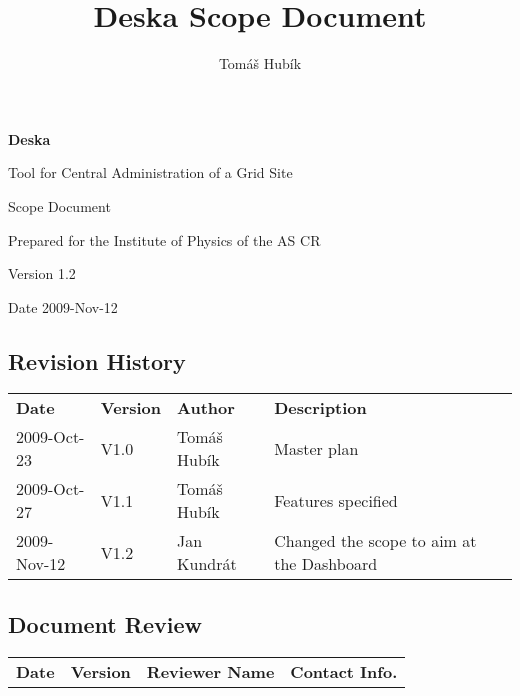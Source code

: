 \documentclass[12pt]{article}
\author{Tomáš Hubík}
\title{Deska Scope Document}
\begin{document}
{\Huge \textbf{Deska}}

\vspace{0.2in}

{\large Tool for Central Administration of a Grid Site}

\vspace{0.5in}

{\large Scope Document}

\vspace{0.2in}

{\large Prepared for the Institute of Physics of the AS CR}

\vspace{0.2in}

{\large Version 1.2}

\vspace{0.2in}

{\large Date 2009-Nov-12}

\vspace{0.5in}

\subsection*{Revision History}

\begin{table}[!h]
	\begin{tabular}{l l l l}
		\textbf{Date} & \textbf{Version} & \textbf{Author} & \textbf{Description} \\
		2009-Oct-23 & V1.0 & Tomáš Hubík & Master plan \\
		2009-Oct-27 & V1.1 & Tomáš Hubík & Features specified \\
		2009-Nov-12 & V1.2 & Jan Kundrát & Changed the scope to aim at the
        Dashboard \\
	\end{tabular}
	\label{tab:RevisionHistory}
\end{table}


\subsection*{Document Review}

\begin{table}[!h]
	\begin{tabular}{l l l l}
		\textbf{Date} & \textbf{Version} & \textbf{Reviewer Name} & \textbf{Contact Info.} \\
	\end{tabular}
	\label{tab:DocumentReview}
\end{table}
\end{document}
